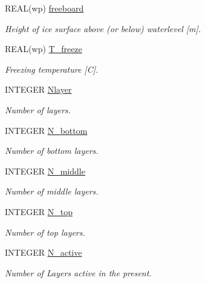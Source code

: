 \begin{DoxyCompactItemize}
REAL(wp) \hyperlink{namespacemo__data_aef61c6317d4baba778438cea10b64412}{freeboard}
\begin{DoxyCompactList}\small\item\em Height of ice surface above (or below) waterlevel \mbox{[}m\mbox{]}. \item\end{DoxyCompactList}\item 
REAL(wp) \hyperlink{namespacemo__data_a75b714d38b619ba4c6608d8f833cf159}{T\_\-freeze}
\begin{DoxyCompactList}\small\item\em Freezing temperature \mbox{[}C\mbox{]}. \item\end{DoxyCompactList}\item 
INTEGER \hyperlink{namespacemo__data_ab0b091ff23970ff2939892c9d8f788f1}{Nlayer}
\begin{DoxyCompactList}\small\item\em Number of layers. \item\end{DoxyCompactList}\item 
INTEGER \hyperlink{namespacemo__data_a9c89af560a3d2f1fe1027bf81125b16c}{N\_\-bottom}
\begin{DoxyCompactList}\small\item\em Number of bottom layers. \item\end{DoxyCompactList}\item 
INTEGER \hyperlink{namespacemo__data_a1140e1d6804c776a152d059c6ecd8375}{N\_\-middle}
\begin{DoxyCompactList}\small\item\em Number of middle layers. \item\end{DoxyCompactList}\item 
INTEGER \hyperlink{namespacemo__data_a4be9ef8c44dfc2c8fccc353a2fc5fc79}{N\_\-top}
\begin{DoxyCompactList}\small\item\em Number of top layers. \item\end{DoxyCompactList}\item 
INTEGER \hyperlink{namespacemo__data_adcca7f2476501b41d758129cc352af3b}{N\_\-active}
\begin{DoxyCompactList}\small\item\em Number of Layers active in the present. \item\end{DoxyCompactList}\item 

\end{DoxyCompactItemize}
